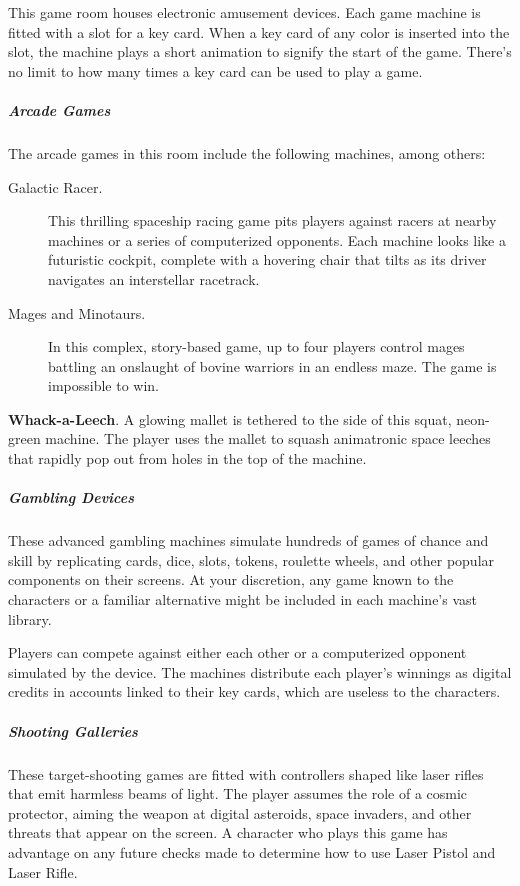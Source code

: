 \documentclass[10pt,a4paper,twoside,bg=print,twocolumn,openany,nodeprecatedcode]{dndbook}
\begin{document}
This game room houses electronic amusement devices. Each game machine is fitted with a slot for a key card. When a key card of any color is inserted into the slot, the machine plays a short animation to signify the start of the game. There's no limit to how many times a key card can be used to play a game.

\subparagraph{Arcade Games}
The arcade games in this room include the following machines, among others:


\begin{description}
\item[Galactic Racer.]
This thrilling spaceship racing game pits players against racers at nearby machines or a series of computerized opponents. Each machine looks like a futuristic cockpit, complete with a hovering chair that tilts as its driver navigates an interstellar racetrack.
\item[Mages and Minotaurs.]
In this complex, story-based game, up to four players control mages battling an onslaught of bovine warriors in an endless maze. The game is impossible to win.
\end{description}

\textbf{Whack-a-Leech}. A glowing mallet is tethered to the side of this squat, neon-green machine. The player uses the mallet to squash animatronic space leeches that rapidly pop out from holes in the top of the machine.

\subparagraph{Gambling Devices}
These advanced gambling machines simulate hundreds of games of chance and skill by replicating cards, dice, slots, tokens, roulette wheels, and other popular components on their screens. At your discretion, any game known to the characters or a familiar alternative might be included in each machine's vast library.

Players can compete against either each other or a computerized opponent simulated by the device. The machines distribute each player's winnings as digital credits in accounts linked to their key cards, which are useless to the characters.

\subparagraph{Shooting Galleries}
These target-shooting games are fitted with controllers shaped like laser rifles that emit harmless beams of light. The player assumes the role of a cosmic protector, aiming the weapon at digital asteroids, space invaders, and other threats that appear on the screen. A character who plays this game has advantage on any future checks made to determine how to use Laser Pistol and Laser Rifle.
\end{document}
